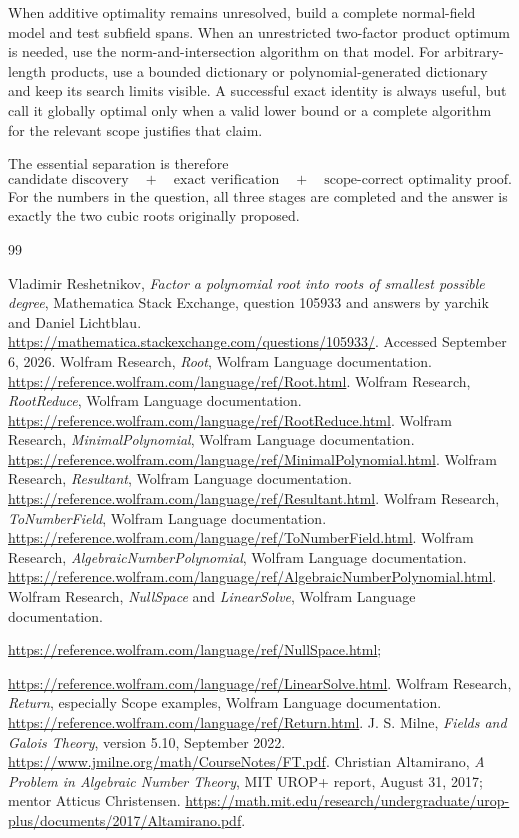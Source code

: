 \documentclass[11pt,a4paper]{article}
\theoremstyle{definition}\newtheorem{definition}[theorem]{Definition}
\theoremstyle{remark}\newtheorem{remark}[theorem]{Remark}
\begin{document}
When additive optimality remains unresolved, build a complete normal-field model and test subfield spans. When an unrestricted two-factor product optimum is needed, use the norm-and-intersection algorithm on that model. For arbitrary-length products, use a bounded dictionary or polynomial-generated dictionary and keep its search limits visible. A successful exact identity is always useful, but call it globally optimal only when a valid lower bound or a complete algorithm for the relevant scope justifies that claim.

The essential separation is therefore
\[
\boxed{\text{candidate discovery}\quad+\quad\text{exact verification}
       \quad+\quad\text{scope-correct optimality proof}.}
\]
For the numbers in the question, all three stages are completed and the answer is exactly the two cubic roots originally proposed.

\newpage
\begin{thebibliography}{99}
 Vladimir Reshetnikov, \emph{Factor a polynomial root into roots of smallest possible degree}, Mathematica Stack Exchange, question 105933 and answers by yarchik and Daniel Lichtblau. \url{https://mathematica.stackexchange.com/questions/105933/}. Accessed September 6, 2026.
 Wolfram Research, \emph{Root}, Wolfram Language documentation. \url{https://reference.wolfram.com/language/ref/Root.html}.
 Wolfram Research, \emph{RootReduce}, Wolfram Language documentation. \url{https://reference.wolfram.com/language/ref/RootReduce.html}.
 Wolfram Research, \emph{MinimalPolynomial}, Wolfram Language documentation. \url{https://reference.wolfram.com/language/ref/MinimalPolynomial.html}.
 Wolfram Research, \emph{Resultant}, Wolfram Language documentation. \url{https://reference.wolfram.com/language/ref/Resultant.html}.
 Wolfram Research, \emph{ToNumberField}, Wolfram Language documentation. \url{https://reference.wolfram.com/language/ref/ToNumberField.html}.
 Wolfram Research, \emph{AlgebraicNumberPolynomial}, Wolfram Language documentation. \url{https://reference.wolfram.com/language/ref/AlgebraicNumberPolynomial.html}.
 Wolfram Research, \emph{NullSpace} and \emph{LinearSolve}, Wolfram Language documentation.\par
\url{https://reference.wolfram.com/language/ref/NullSpace.html};\par
\url{https://reference.wolfram.com/language/ref/LinearSolve.html}.
 Wolfram Research, \emph{Return}, especially Scope examples, Wolfram Language documentation. \url{https://reference.wolfram.com/language/ref/Return.html}.
 J. S. Milne, \emph{Fields and Galois Theory}, version 5.10, September 2022. \url{https://www.jmilne.org/math/CourseNotes/FT.pdf}.
 Christian Altamirano, \emph{A Problem in Algebraic Number Theory}, MIT UROP+ report, August 31, 2017; mentor Atticus Christensen. \url{https://math.mit.edu/research/undergraduate/urop-plus/documents/2017/Altamirano.pdf}.
\end{thebibliography}
\end{document}
